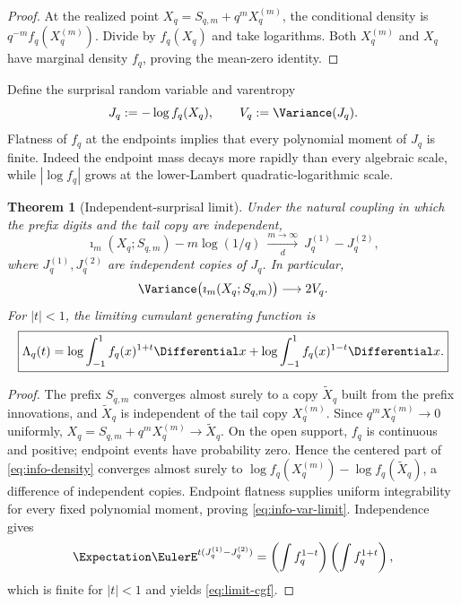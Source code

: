 \documentclass[11pt,oneside]{article}
\newtheorem{theorem}{Theorem}[section]
\theoremstyle{definition}
\theoremstyle{remark}
\begin{document}
\begin{proof}
At the realized point $X_q=S_{q,m}+q^mX_q^{(m)}$, the conditional density is
$q^{-m}f_q(X_q^{(m)})$.  Divide by $f_q(X_q)$ and take logarithms.  Both
$X_q^{(m)}$ and $X_q$ have marginal density $f_q$, proving the mean-zero identity.
\end{proof}

Define the surprisal random variable and varentropy
\begin{equation}
 J_q:=-\log f_q(X_q),
 \qquad V_q:=\Variance(J_q).
 \label{eq:surprisal}
\end{equation}
Flatness of $f_q$ at the endpoints implies that every polynomial moment of $J_q$
is finite.  Indeed the endpoint mass decays more rapidly than every algebraic
scale, while $|\log f_q|$ grows at the lower-Lambert quadratic-logarithmic scale.

\begin{theorem}[Independent-surprisal limit]
\label{thm:surprisal-limit}
Under the natural coupling in which the prefix digits and the tail copy are
independent,
\begin{equation}
 \imath_m(X_q;S_{q,m})-m\log(1/q)
 \ \xrightarrow[d]{m\to\infty}\ J_q^{(1)}-J_q^{(2)},
 \label{eq:surprisal-limit}
\end{equation}
where $J_q^{(1)},J_q^{(2)}$ are independent copies of $J_q$.  In particular,
\begin{equation}
 \Variance\bigl(\imath_m(X_q;S_{q,m})\bigr)\longrightarrow2V_q.
 \label{eq:info-var-limit}
\end{equation}
For $|t|<1$, the limiting cumulant generating function is
\begin{equation}
 \boxed{
 \Lambda_q(t)
 =\log\int_{-1}^{1}f_q(x)^{1+t}\Differential x
 +\log\int_{-1}^{1}f_q(x)^{1-t}\Differential x.}
 \label{eq:limit-cgf}
\end{equation}
\end{theorem}

\begin{proof}
The prefix $S_{q,m}$ converges almost surely to a copy $\widetilde X_q$ built from
the prefix innovations, and $\widetilde X_q$ is independent of the tail copy
$X_q^{(m)}$.  Since $q^mX_q^{(m)}\to0$ uniformly,
$X_q=S_{q,m}+q^mX_q^{(m)}\to\widetilde X_q$.  On the open support, $f_q$ is
continuous and positive; endpoint events have probability zero.  Hence the
centered part of \eqref{eq:info-density} converges almost surely to
$\log f_q(X_q^{(m)})-\log f_q(\widetilde X_q)$, a difference of independent
copies.  Endpoint flatness supplies uniform integrability for every fixed
polynomial moment, proving \eqref{eq:info-var-limit}.  Independence gives
\[
 \Expectation\EulerE^{t(J_q^{(1)}-J_q^{(2)})}
 =\left(\int f_q^{1-t}\right)\left(\int f_q^{1+t}\right),
\]
which is finite for $|t|<1$ and yields \eqref{eq:limit-cgf}.
\end{proof}
\end{document}
